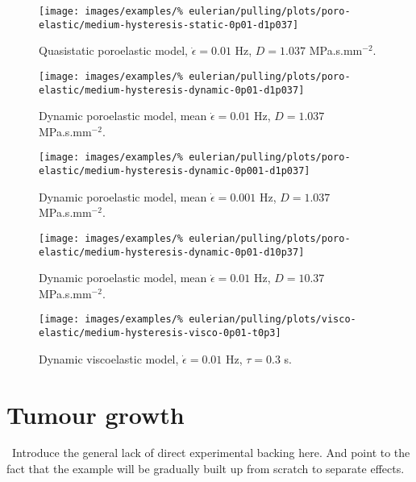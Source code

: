 \clearpage

\begin{figure}[!hptb]
\centering
\texttt{[image: images/examples/\%
eulerian/pulling/plots/poro-elastic/medium-hysteresis-static-0p01-d1p037]}
\caption{Quasistatic poroelastic model, $\dot{\epsilon}=0.01$ Hz, $D=1.037$
  MPa.s.mm$^{-2}$.}
\label{medium-hysteresis-static-0p01-d1p037}
\end{figure}

\begin{figure}[!hptb]
\centering
\texttt{[image: images/examples/\%
eulerian/pulling/plots/poro-elastic/medium-hysteresis-dynamic-0p01-d1p037]}
\caption{Dynamic poroelastic model, mean $\dot{\epsilon}=0.01$ Hz, $D=1.037$
  MPa.s.mm$^{-2}$.}
\label{medium-hysteresis-dynamic-0p01-d1p037}
\end{figure}

\begin{figure}[!hptb]
\centering
\texttt{[image: images/examples/\%
eulerian/pulling/plots/poro-elastic/medium-hysteresis-dynamic-0p001-d1p037]}
\caption{Dynamic poroelastic model, mean $\dot{\epsilon}=0.001$ Hz, $D=1.037$
  MPa.s.mm$^{-2}$.}
\label{medium-hysteresis-dynamic-0p001-d1p037}
\end{figure}

\begin{figure}[!hptb]
\centering
\texttt{[image: images/examples/\%
eulerian/pulling/plots/poro-elastic/medium-hysteresis-dynamic-0p01-d10p37]}
\caption{Dynamic poroelastic model, mean $\dot{\epsilon}=0.01$ Hz, $D=10.37$
  MPa.s.mm$^{-2}$.}
\label{medium-hysteresis-dynamic-0p01-d10p37}
\end{figure}

\begin{figure}[!hptb]
\centering
\texttt{[image: images/examples/\%
eulerian/pulling/plots/visco-elastic/medium-hysteresis-visco-0p01-t0p3]}
\caption{Dynamic viscoelastic model, $\dot{\epsilon}=0.01$ Hz,
  $\tau=0.3$ s.}
\label{medium-hysteresis-visco-0p01-t0p3}
\end{figure}

\section{Tumour growth}
\label{tumour-growth}

\textbullet\ Introduce the general lack of direct experimental
backing here. And point to the fact that the example will be gradually
built up from scratch to separate effects.

